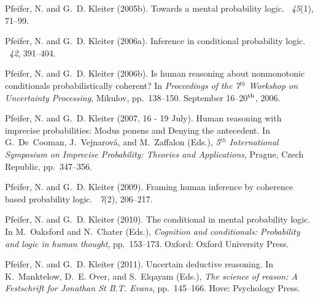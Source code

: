 \documentclass[11pt]{article}
\begin{document}
\begin{thebibliography}{}
Pfeifer, N. and G.~D. Kleiter (2005b).
\newblock Towards a mental probability logic.
~{\em 45\/}(1), 71--99.

Pfeifer, N. and G.~D. Kleiter (2006a).
\newblock Inference in conditional probability logic.
~{\em 42}, 391--404.

Pfeifer, N. and G.~D. Kleiter (2006b).
\newblock Is human reasoning about nonmonotonic conditionals probabilistically
  coherent?
\newblock In {\em Proceedings of the 7$^{th}$ Workshop on Uncertainty
  Processing}, Mikulov, pp.\  138--150. September 16--20$^{\textnormal{th}}$,
  2006.

Pfeifer, N. and G.~D. Kleiter (2007, 16 - 19 July).
\newblock Human reasoning with imprecise probabilities: {M}odus ponens and
  {D}enying the antecedent.
\newblock In G.~{De~Cooman}, J.~Vejnarov\'a, and M.~Zaffalon (Eds.), {\em
  5$^{th}$ {I}nternational {S}ymposium on {I}mprecise {P}robability: {T}heories
  and {A}pplications}, Prague, Czech Republic, pp.\  347--356.

Pfeifer, N. and G.~D. Kleiter (2009).
\newblock Framing human inference by coherence based probability logic.
~{\em 7\/}(2), 206--217.

Pfeifer, N. and G.~D. Kleiter (2010).
\newblock The conditional in mental probability logic.
\newblock In M.~Oaksford and N.~Chater (Eds.), {\em Cognition and conditionals:
  {P}robability and logic in human thought}, pp.\  153--173. Oxford: Oxford
  University Press.

Pfeifer, N. and G.~D. Kleiter (2011).
\newblock Uncertain deductive reasoning.
\newblock In K.~Manktelow, D.~E. Over, and S.~Elqayam (Eds.), {\em The science
  of reason: {A} {F}estschrift for {J}onathan {S}t {B.T.} {E}vans}, pp.\
  145--166. Hove: Psychology Press.


\end{thebibliography}
\end{document}
